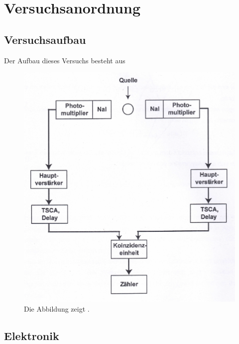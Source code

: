 \section{Versuchsanordnung}

\subsection{Versuchsaufbau}

Der Aufbau dieses Versuchs besteht aus 
\begin{figure}[H]
	\centering
	\includegraphics[width=1.0\textwidth]{img/schaltung}
	\caption{Die Abbildung zeigt .}
	\label{schaltung}
\end{figure}
\noindent 

\subsection{Elektronik}


